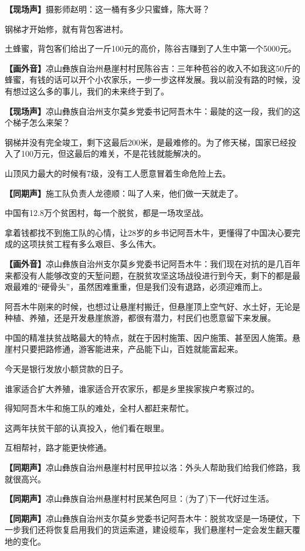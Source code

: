 \documentclass{ctexart}
\newcommand{\zkh}[1]{\textbf{\hspace{-2.7em} 【#1】}}
\begin{document}
\zkh{现场声}摄影师赵明：这一桶有多少只蜜蜂，陈大哥？

钢梯才开始修，就有背包客进村。

土蜂蜜，背包客们给出了一斤100元的高价，陈谷吉赚到了人生中第一个5000元。

\zkh{画外音}凉山彝族自治州悬崖村村民陈谷吉：三年种苞谷的收入不如我这50斤的蜂蜜，有钱的话可以开个小农家乐，一步一步这样发展。我以前没有路的时候，没有想过这么多的事儿，我们的未来终于到了。

\zkh{现场声}凉山彝族自治州支尔莫乡党委书记阿吾木牛：最陡的这一段，我们的这个梯子怎么来架？

钢梯并没有完全竣工，剩下这最后200米，是最难修的。为了修天梯，国家已经投入了100万元，但这最后的难关，不是花钱就能解决的。

山顶风力最大的时候有7级，没有工人愿意冒着生命危险上去。

\zkh{同期声}施工队负责人龙德顺：叫了人来，他们做一天就走了。

中国有12.8万个贫困村，每一个脱贫，都是一场攻坚战。

拿着钱都找不到施工队的心情，让28岁的乡书记阿吾木牛，更懂得了中国决心要完成的这项扶贫工程有多么艰巨、多么伟大。

\zkh{画外音}凉山彝族自治州支尔莫乡党委书记阿吾木牛：我们现在对抗的是几百年来都没有人能够改变的天堑问题，在脱贫攻坚这场战役进行到今天，剩下的都是最艰最难的``硬骨头''，虽然困难重重，但是我们没有退路，必须迎难而上。

阿吾木牛刚来的时候，也想过让悬崖村搬迁，但悬崖顶上空气好、水土好，无论是种植、养殖，还是开发悬崖旅游，都很有潜力，村民们也愿意留下来发展。

中国的精准扶贫战略最大的特点，就在于因村施策、因户施策、甚至因人施策。悬崖村只要把路修通，游客能进来，产品能下山，百姓就能富起来。

今天是银行发放小额贷款的日子。

谁家适合扩大养殖，谁家适合开农家乐，都是乡里挨家挨户考察过的。

得知阿吾木牛和施工队的难处，全村人都赶来帮忙。

这两年扶贫干部的认真投入，他们看在眼里。

互相帮衬，路才能更快修通。

\zkh{同期声}凉山彝族自治州悬崖村村民甲拉以洛：外头人帮助我们给我们修路，我就很高兴。

\zkh{同期声}凉山彝族自治州悬崖村村民某色阿旦：(为了)下一代好过生活。

\zkh{同期声}凉山彝族自治州支尔莫乡党委书记阿吾木牛：脱贫攻坚是一场硬仗，下一步我们还将恢复启用我们的货运索道，建设缆车，我们悬崖村一定会发生翻天覆地的变化。
\end{document}
